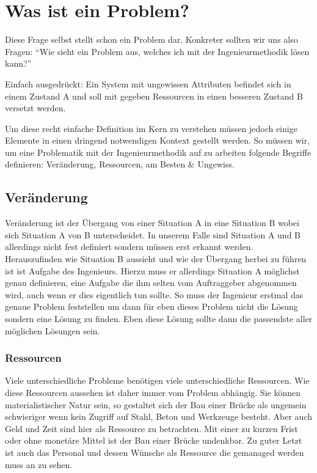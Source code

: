 \section{Was ist ein Problem?}

Diese Frage selbst stellt schon ein Problem dar. Konkreter sollten wir uns also Fragen: 
“Wie sieht ein Problem aus, welches ich mit der Ingenieurmethodik lösen kann?” 

Einfach ausgedrückt: Ein System mit ungewissen Attributen befindet sich in einem Zustand A und 
soll mit gegeben Ressourcen in einen besseren Zustand B versetzt werden. 

Um diese recht einfache Definition im Kern zu verstehen müssen jedoch einige Elemente in 
einen dringend notwendigen Kontext gestellt werden. So müssen wir, um eine Problematik mit 
der Ingenieurmethodik auf zu arbeiten folgende Begriffe definieren: Veränderung, Ressourcen, 
am Besten \& Ungewiss.

    \subsection{Veränderung}

    Veränderung ist der Übergang von einer Situation A in eine Situation B wobei sich Situation A von B 
    unterscheidet. In unserem Falle sind Situation A und B allerdings nicht fest definiert sondern müssen 
    erst erkannt werden. Herauszufinden wie Situation B aussieht und wie der Übergang herbei zu führen ist
    ist Aufgabe des Ingenieurs. Hierzu muss er allerdings Situation A möglichst genau definieren, eine
    Aufgabe die ihm selten vom Auftraggeber abgenommen wird, auch wenn er dies eigentlich tun sollte.
    So muss der Ingenieur erstmal das genaue Problem feststellen um dann für eben dieses Problem nicht 
    die Lösung sondern eine Lösung zu finden. Eben diese Lösung sollte dann die passendste aller
    möglichen Lösungen sein.

    \subsubsection{Ressourcen}

    Viele unterschiedliche Probleme benötigen viele unterschiedliche Ressourcen. Wie diese Ressourcen 
    aussehen ist daher immer vom Problem abhängig. Sie können materialistischer Natur sein, so gestaltet 
    sich der Bau einer Brücke als ungemein schwieriger wenn kein Zugriff auf Stahl, Beton und Werkzeuge 
    besteht. Aber auch Geld und Zeit sind hier als Ressource zu betrachten. Mit einer zu kurzen Frist 
    oder ohne monetäre Mittel ist der Bau einer Brücke undenkbar. Zu guter Letzt ist auch das Personal 
    und dessen Wünsche als Ressource die gemanaged werden muss an zu sehen.

